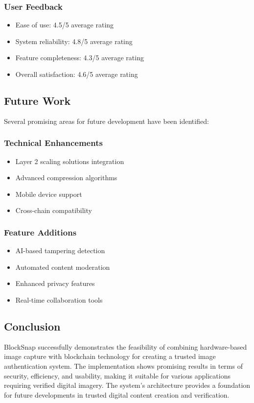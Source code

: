 \documentclass[conference]{IEEEtran}
\begin{document}
\subsubsection{User Feedback}
\begin{itemize}
    \item Ease of use: 4.5/5 average rating
    \item System reliability: 4.8/5 average rating
    \item Feature completeness: 4.3/5 average rating
    \item Overall satisfaction: 4.6/5 average rating
\end{itemize}

\subsection{Future Work}
Several promising areas for future development have been identified:

\subsubsection{Technical Enhancements}
\begin{itemize}
    \item Layer 2 scaling solutions integration
    \item Advanced compression algorithms
    \item Mobile device support
    \item Cross-chain compatibility
\end{itemize}

\subsubsection{Feature Additions}
\begin{itemize}
    \item AI-based tampering detection
    \item Automated content moderation
    \item Enhanced privacy features
    \item Real-time collaboration tools
\end{itemize}

\subsection{Conclusion}
BlockSnap successfully demonstrates the feasibility of combining hardware-based image capture with blockchain technology for creating a trusted image authentication system. The implementation shows promising results in terms of security, efficiency, and usability, making it suitable for various applications requiring verified digital imagery. The system's architecture provides a foundation for future developments in trusted digital content creation and verification.
\end{document}
